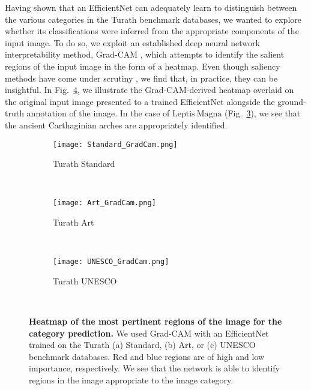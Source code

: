 \documentclass{article}
\begin{document}
Having shown that an EfficientNet can adequately learn to distinguish between the various categories in the Turath benchmark databases, we wanted to explore whether its classifications were inferred from the appropriate components of the input image. To do so, we exploit an established deep neural network interpretability method, Grad-CAM \cite{Selvaraju2017}, which attempts to identify the salient regions of the input image in the form of a heatmap. Even though saliency methods have come under scrutiny \cite{Tomsett2020}, we find that, in practice, they can be insightful. In Fig.~\ref{fig:grad_cam}, we illustrate the Grad-CAM-derived heatmap overlaid on the original input image presented to a trained EfficientNet alongside the ground-truth annotation of the image. In the case of $\mathrm{Leptis \ Magna}$ (Fig.~\ref{fig:unesco_grad_cam}), we see that the ancient Carthaginian arches are appropriately identified. 

\begin{figure}[!t]
    \centering
    \begin{subfigure}{0.3\textwidth}
    \texttt{[image: Standard\_GradCam.png]}
    \caption{Turath Standard}
    \label{fig:standard_grad_cam}
    \end{subfigure}
    ~
        \begin{subfigure}{0.3\textwidth}
    \texttt{[image: Art\_GradCam.png]}
    \caption{Turath Art}
    \label{fig:art_grad_cam}
    \end{subfigure}
    ~
    \begin{subfigure}{0.3\textwidth}
    \texttt{[image: UNESCO\_GradCam.png]}
    \caption{Turath UNESCO}
    \label{fig:unesco_grad_cam}
    \end{subfigure}
    ~
    \caption{\textbf{Heatmap of the most pertinent regions of the image for the category prediction.} We used Grad-CAM with an EfficientNet trained on the Turath (a) Standard, (b) Art, or (c) UNESCO benchmark databases. Red and blue regions are of high and low importance, respectively. We see that the network is able to identify regions in the image appropriate to the image category.}
    \label{fig:grad_cam}
\end{figure}


\end{document}
